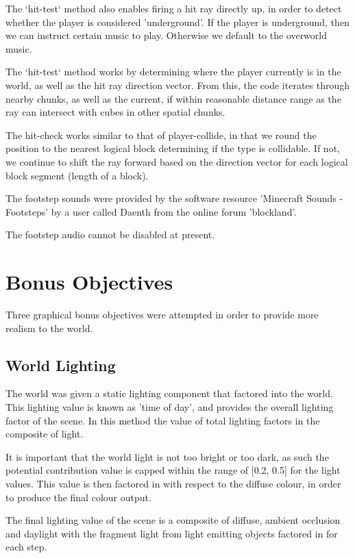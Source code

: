 \documentclass{book}
\begin{document}
The `hit-test` method also enables firing a hit ray directly up, in order to detect whether the player is considered 'underground'.  If the player is underground, then we can instruct certain music to play.  Otherwise we default to the overworld music.
    
The `hit-test` method works by determining where the player currently is in the world, as well as the hit ray direction vector.  From this, the code iterates through nearby chunks, as well as the current, if within reasonable distance range as the ray can intersect with cubes in other spatial chunks.
    
The hit-check works similar to that of player-collide, in that we round the position to the nearest logical block determining if the type is collidable.  If not, we continue to shift the ray forward based on the direction vector for each logical block segment (length of a block).
    
The footstep sounds were provided by the software resource 'Minecraft Sounds - Footsteps' by a user called Daenth from the online forum 'blockland'.
    
The footstep audio cannot be disabled at present.
    
\section{Bonus Objectives}
Three graphical bonus objectives were attempted in order to provide more realism to the world.
    
\subsection{World Lighting}
The world was given a static lighting component that factored into the world.  This lighting value is known as 'time of day', and provides the overall lighting factor of the scene.  In this method the value of total lighting factors in the composite of light.
    
It is important that the world light is not too bright or too dark, as such the potential contribution value is capped within the range of [0.2, 0.5] for the light values.  This value is then factored in with respect to the diffuse colour, in order to produce the final colour output.
    
The final lighting value of the scene is a composite of diffuse, ambient occlusion and daylight with the fragment light from light emitting objects factored in for each step. 
    
\end{document}

